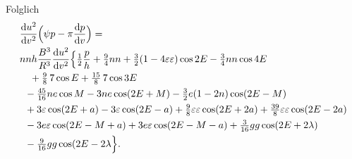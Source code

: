 \noindent Folglich
\[
\begin{aligned}
&\frac{\mathrm du^2}{\mathrm dv^2}
 \Bigl(\psi p-\pi\frac{\mathrm dp}{\mathrm dv}\Bigr)=\\
&nnh\frac{B^3}{R^3}\frac{\mathrm du^2}{\mathrm dv^2}
 \Bigl\{\tfrac12\frac{p}{h}+\tfrac94nn
 +\tfrac32(1-4\varepsilon\varepsilon)\cos2E-\tfrac34nn\cos4E\\
&\quad{}+\tfrac98\,7\cos E+\tfrac{15}{8}\,7\cos3E\\
&\enspace{}-\tfrac{45}{16}ne\cos M-3ne\cos(2E+M)
 -\tfrac32e(1-2n)\cos(2E-M)\\
&\enspace{}+3\varepsilon\cos(2E+a)-3\varepsilon\cos(2E-a)
 +\tfrac98\varepsilon\varepsilon\cos(2E+2a)
 +\tfrac{39}{8}\varepsilon\varepsilon\cos(2E-2a)\\
&\enspace{}-3e\varepsilon\cos(2E-M+a)+3e\varepsilon\cos(2E-M-a)
 +\tfrac{3}{16}gg\cos(2E+2\lambda)\\
&\enspace{}-\tfrac{9}{16}gg\cos(2E-2\lambda\Bigr\}.
\end{aligned}
\]
\clearpage
\endgroup
